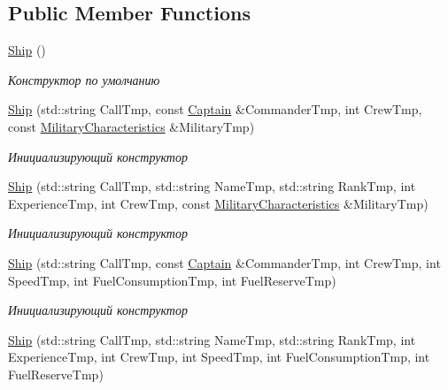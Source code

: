 \subsection*{Public Member Functions}
\begin{DoxyCompactItemize}
\item 
\mbox{\label{class_aircraft_carrier_group_1_1_ship_ab212e1c1cee164094489febc49bc7d65}} 
\mbox{\hyperlink{class_aircraft_carrier_group_1_1_ship_ab212e1c1cee164094489febc49bc7d65}{Ship}} ()
\begin{DoxyCompactList}\small\item\em Конструктор по умолчанию \end{DoxyCompactList}\item 
\mbox{\hyperlink{class_aircraft_carrier_group_1_1_ship_a1886e067969dae38d4a679de17f490fc}{Ship}} (std\+::string Call\+Tmp, const \mbox{\hyperlink{struct_aircraft_carrier_group_1_1_captain}{Captain}} \&Commander\+Tmp, int Crew\+Tmp, const \mbox{\hyperlink{class_aircraft_carrier_group_1_1_military_characteristics}{Military\+Characteristics}} \&Military\+Tmp)
\begin{DoxyCompactList}\small\item\em Инициализирующий конструктор \end{DoxyCompactList}\item 
\mbox{\hyperlink{class_aircraft_carrier_group_1_1_ship_a3465b634fa28d353509ea05a131d5af8}{Ship}} (std\+::string Call\+Tmp, std\+::string Name\+Tmp, std\+::string Rank\+Tmp, int Experience\+Tmp, int Crew\+Tmp, const \mbox{\hyperlink{class_aircraft_carrier_group_1_1_military_characteristics}{Military\+Characteristics}} \&Military\+Tmp)
\begin{DoxyCompactList}\small\item\em Инициализирующий конструктор \end{DoxyCompactList}\item 
\mbox{\hyperlink{class_aircraft_carrier_group_1_1_ship_ac6e81f533e9ee6165423668837cef5fd}{Ship}} (std\+::string Call\+Tmp, const \mbox{\hyperlink{struct_aircraft_carrier_group_1_1_captain}{Captain}} \&Commander\+Tmp, int Crew\+Tmp, int Speed\+Tmp, int Fuel\+Consumption\+Tmp, int Fuel\+Reserve\+Tmp)
\begin{DoxyCompactList}\small\item\em Инициализирующий конструктор \end{DoxyCompactList}\item 
\mbox{\hyperlink{class_aircraft_carrier_group_1_1_ship_ae4f36b334822955bfd4304835b9a7e7d}{Ship}} (std\+::string Call\+Tmp, std\+::string Name\+Tmp, std\+::string Rank\+Tmp, int Experience\+Tmp, int Crew\+Tmp, int Speed\+Tmp, int Fuel\+Consumption\+Tmp, int Fuel\+Reserve\+Tmp)

\end{DoxyCompactItemize}
